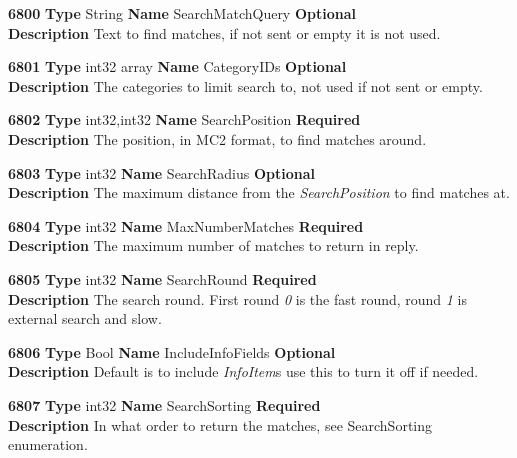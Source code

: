 \documentclass[a4paper]{article}
\begin{document}
\begin{list}{\textbf{ParamID}}{}
\item \textbf{6800} \textbf{Type} String \textbf{Name} SearchMatchQuery
                 \textbf{Optional} \\
  \textbf{Description} Text to find matches, if not sent or empty it is not
  used.

\item \textbf{6801} \textbf{Type} int32 array \textbf{Name} CategoryIDs
                 \textbf{Optional} \\
  \textbf{Description} The categories to limit search to, not used if not sent
                       or empty.

\item \textbf{6802} \textbf{Type} int32,int32 \textbf{Name} SearchPosition
                 \textbf{Required} \\
  \textbf{Description} The position, in MC2 format, to find matches around.

\item \textbf{6803} \textbf{Type} int32 \textbf{Name} SearchRadius
                 \textbf{Optional} \\
  \textbf{Description} The maximum distance from the \emph{SearchPosition} to
  find matches at.

\item \textbf{6804} \textbf{Type} int32 \textbf{Name} MaxNumberMatches
                 \textbf{Required} \\
  \textbf{Description} The maximum number of matches to return in reply.

\item \textbf{6805} \textbf{Type} int32 \textbf{Name} SearchRound
                 \textbf{Required} \\
  \textbf{Description} The search round. First round \emph{0} is the fast 
  round, round \emph{1} is external search and slow.

\item \textbf{6806} \textbf{Type} Bool \textbf{Name} IncludeInfoFields
                 \textbf{Optional} \\
  \textbf{Description} Default is to include \emph{InfoItem}s use this to 
  turn it off if needed.

\item \textbf{6807} \textbf{Type} int32 \textbf{Name} SearchSorting
                 \textbf{Required} \\
  \textbf{Description} In what order to return the matches, see SearchSorting
  enumeration.

\end{list}
\end{document}
